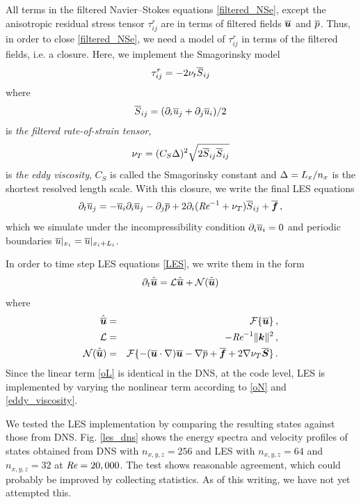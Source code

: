\documentclass[a4paper, 11pt]{article}
\begin{document}
All terms in the filtered
Navier--Stokes equations \cref{filtered_NSe}, except the anisotropic residual
stress tensor $\tau_{ij}^r$ are in terms of filtered fields $\overline{\bm{u}}$ and
$\overline{p}$. Thus, in order to close \cref{filtered_NSe}, we need a model of
$\tau_{ij}^r$ in terms of the filtered fields, i.e. a closure. Here, we
implement the Smagorinsky model 
\begin{equation}
    \tau_{ij}^r = - 2 \nu_t \overline{S}_{ij} 
\end{equation}
where  
\begin{equation}
    \overline{S}_{ij} = (\partial_i \overline{u}_j + \partial_j \overline{u}_i) / 2
\end{equation}
is \emph{the filtered rate-of-strain tensor}, 
\begin{equation}
    \nu_T = (C_S \Delta)^2 \sqrt{2 \overline{S}_{ij} \overline{S}_{ij}}
    \label{eddy_viscosity}
\end{equation}
is \emph{the eddy viscosity}, $C_S$ is called the Smagorinsky constant  and
$\Delta = L_x / n_x$ is the shortest resolved length scale. With this closure, 
we write the final LES equations
\begin{equation}
	\partial_t \overline{u}_j = 
        -\overline{u}_i  \partial_i \overline{u}_j - \partial_j \overline{p} 
        + 2 \partial_i (\textit{Re}^{-1} + \nu_T) \overline{S}_{ij} + \overline{\bm{f}} \, , 
        \label{LES}
\end{equation}
which we simulate under the incompressibility condition $\partial_i \overline{u}_i = 0$ 
and periodic boundaries $\overline{u}|_{x_i} = \overline{u}|_{x_i + L_i}$.

In order to time step LES equations \cref{LES}, we write them in the form
\begin{equation}
    \partial_t \hat{\overline{\bm{u}}} = \mathcal{L} \hat{\overline{\bm{u}}} + \mathcal{N} (\hat{\overline{\bm{u}}}) \label{eq_time_step_LES}
\end{equation}
where
\begin{eqnarray}
    \hat{\overline{\bm{u}}} &=& \mathcal{F} \{ \overline{\bm{u}} \}   \,, \label{Fourier} \\
    \mathcal{L} &=& - \textit{Re}^{-1} \| \bm{k} \|^2  \,, \label{oL} \\ 
    \mathcal{N} (\hat{\overline{\bm{u}}}) &=& \mathcal{F} \{- (\overline{\bm{u}} \cdot \nabla) \overline{\bm{u}} 
                              - \nabla \overline{p} 
                              + \overline{\bm{f}}
                              + 2 \nabla \nu_T \overline{\bm{S}} \} \, . \label{oN}
\end{eqnarray}
Since the linear term \cref{oL} is identical in the DNS, at the code level, 
LES is implemented by varying the nonlinear term according to \cref{oN}
and \cref{eddy_viscosity}.

We tested the LES implementation by comparing the resulting states against those 
from DNS. Fig. \ref{les_dns} shows the energy spectra and velocity profiles of 
states obtained from DNS with $n_{x,y,z} = 256$ and LES with $n_{x,y,z} = 64$
and $n_{x,y,z} = 32$ at $\textit{Re} = 20,000$. The test shows reasonable agreement, 
which could probably be improved by collecting statistics. As of this writing, 
we have not yet attempted this. 
\end{document}
